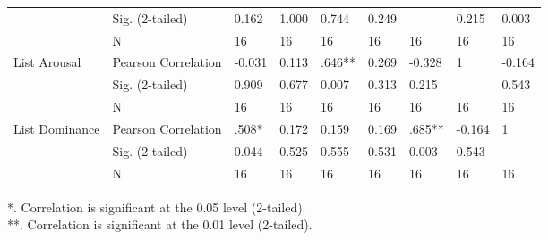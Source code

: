 \begin{landscape}
\begin{table}[hbtp!]
\begin{tabular}{|l|l|l m{1.5cm} m{1.5cm} m{2cm} m{1.5cm} m{1.5cm} m{2cm}|}
                    & Sig. (2-tailed)     & 0.162  & 1.000  & 0.744  & 0.249  &        & 0.215  & 0.003  \\
                    & N                   & 16                  & 16        & 16          & 16        & 16         & 16           & 16         \\
List Arousal        & Pearson Correlation & -0.031 & 0.113  & .646** & 0.269  & -0.328 & 1      & -0.164 \\
                    & Sig. (2-tailed)     & 0.909  & 0.677  & 0.007  & 0.313  & 0.215  &        & 0.543  \\
                    & N                   & 16                  & 16        & 16          & 16        & 16         & 16           & 16         \\
List Dominance          & Pearson Correlation & .508*  & 0.172  & 0.159  & 0.169  & .685** & -0.164 & 1      \\
                    & Sig. (2-tailed)     & 0.044  & 0.525  & 0.555  & 0.531  & 0.003  & 0.543  &        \\
                    & N                   & 16                  & 16        & 16          & 16        & 16         & 16           & 16 \\\hline 
\end{tabular}
\end{table}
*. Correlation is significant at the 0.05 level (2-tailed). \\	
**. Correlation is significant at the 0.01 level (2-tailed).
\clearpage


\end{landscape}
